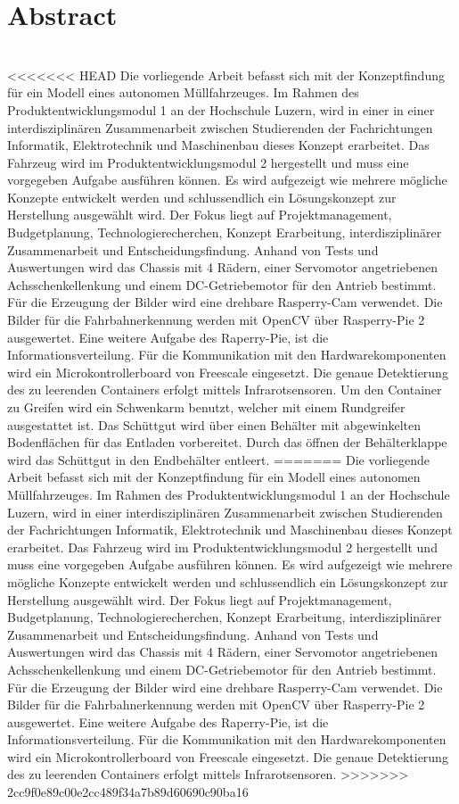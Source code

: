 \section{Abstract}\\[0.2cm]
<<<<<<< HEAD
Die vorliegende Arbeit befasst sich mit der Konzeptfindung für ein Modell eines autonomen Müllfahrzeuges. Im Rahmen des Produktentwicklungsmodul 1 an der Hochschule Luzern, wird in einer in einer interdisziplinären Zusammenarbeit zwischen Studierenden der Fachrichtungen Informatik, Elektrotechnik und Maschinenbau dieses Konzept erarbeitet. Das Fahrzeug wird im Produktentwicklungsmodul 2 hergestellt und muss eine vorgegeben Aufgabe ausführen können. Es wird aufgezeigt wie mehrere mögliche Konzepte entwickelt werden und schlussendlich ein Lösungskonzept zur Herstellung ausgewählt wird. Der Fokus liegt auf Projektmanagement, Budgetplanung, Technologierecherchen, Konzept Erarbeitung, interdisziplinärer Zusammenarbeit und Entscheidungsfindung. Anhand von Tests und Auswertungen wird das Chassis mit 4 Rädern, einer Servomotor angetriebenen Achsschenkellenkung und einem DC-Getriebemotor für den Antrieb bestimmt. Für die Erzeugung der Bilder wird eine drehbare Rasperry-Cam verwendet. Die Bilder für die Fahrbahnerkennung werden mit OpenCV über Rasperry-Pie 2 ausgewertet. Eine weitere Aufgabe des Raperry-Pie, ist die Informationsverteilung. Für die Kommunikation mit den Hardwarekomponenten wird ein Microkontrollerboard von Freescale eingesetzt. Die genaue Detektierung des zu leerenden Containers erfolgt mittels Infrarotsensoren. Um den Container zu Greifen wird ein Schwenkarm benutzt, welcher mit einem Rundgreifer ausgestattet ist. Das Schüttgut wird über einen Behälter mit abgewinkelten Bodenflächen für das Entladen vorbereitet. Durch das öffnen der Behälterklappe wird das Schüttgut in den Endbehälter entleert.
=======
Die vorliegende Arbeit befasst sich mit der Konzeptfindung für ein Modell eines autonomen Müllfahrzeuges. Im Rahmen des Produktentwicklungsmodul 1 an der Hochschule Luzern, wird in einer interdisziplinären Zusammenarbeit zwischen Studierenden der Fachrichtungen Informatik, Elektrotechnik und Maschinenbau dieses Konzept erarbeitet. Das Fahrzeug wird im Produktentwicklungsmodul 2 hergestellt und muss eine vorgegeben Aufgabe ausführen können. Es wird aufgezeigt wie mehrere mögliche Konzepte entwickelt werden und schlussendlich ein Lösungskonzept zur Herstellung ausgewählt wird. Der Fokus liegt auf Projektmanagement, Budgetplanung, Technologierecherchen, Konzept Erarbeitung, interdisziplinärer Zusammenarbeit und Entscheidungsfindung. Anhand von Tests und Auswertungen wird das Chassis mit 4 Rädern, einer Servomotor angetriebenen Achsschenkellenkung und einem DC-Getriebemotor für den Antrieb bestimmt. Für die Erzeugung der Bilder wird eine drehbare Rasperry-Cam verwendet. Die Bilder für die Fahrbahnerkennung werden mit OpenCV über Rasperry-Pie 2 ausgewertet. Eine weitere Aufgabe des Raperry-Pie, ist die Informationsverteilung. Für die Kommunikation mit den Hardwarekomponenten wird ein Microkontrollerboard von Freescale eingesetzt. Die genaue Detektierung des zu leerenden Containers erfolgt mittels Infrarotsensoren.  
>>>>>>> 2cc9f0e89c00e2cc489f34a7b89d60690c90ba16
\clearpage
